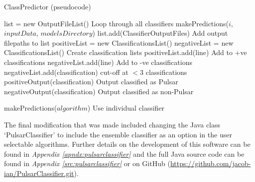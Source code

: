 \documentclass{article}
\begin{document}
\begin{algorithm}
    \caption{ClassPredictor (pseudocode)}
    \label{alg:classpredictor}
    \begin{algorithmic}[1]
            \State list = new OutputFileList()
                \Comment Loop through all classifiers
                \State makePredictions($i$, $inputData$, $modelsDirectory$)
                \State list.add(ClassifierOutputFiles)
                \Comment Add output filepaths to list
            \EndFor
            \State positiveList = new ClassificationsList()
            \State negativeList = new ClassificationsList()
            \Comment Create classification lists
                        \State positiveList.add(line)
                        \Comment Add to +ve classifications
                    \EndFor
                        \State negativeList.add(line)
                        \Comment Add to -ve classifications
                    \EndFor
                \EndIf
            \EndFor
                    \State negativeList.add(classification)
                    \Comment cut-off at $< 3$ classifications
                \Else
                    \State positiveOutput(classification)
                    \Comment Output classified as Pulsar
                \EndIf
            \EndFor
                \State negativeOutput(classification)
                \Comment Output classified as non-Pulsar
            \EndFor

        \Else 
            \State makePredictions($algorithm$)
            \Comment Use individual classifier
        \EndIf
    \end{algorithmic}
\end{algorithm}

The final modification that was made included changing the Java class `PulsarClassifier' to include the ensemble classifier as an option in the user selectable algorithms. Further details on the development of this software can be found in \emph{Appendix \ref{apndx:pulsarclassifier}} and the full Java source code can be found in \emph{Appendix \ref{src:pulsarclassifier}} or on GitHub (\href{https://github.com/jacob-ian/PulsarClassifier.git}{https://github.com/jacob-ian/PulsarClassifier.git}).
\end{document}
